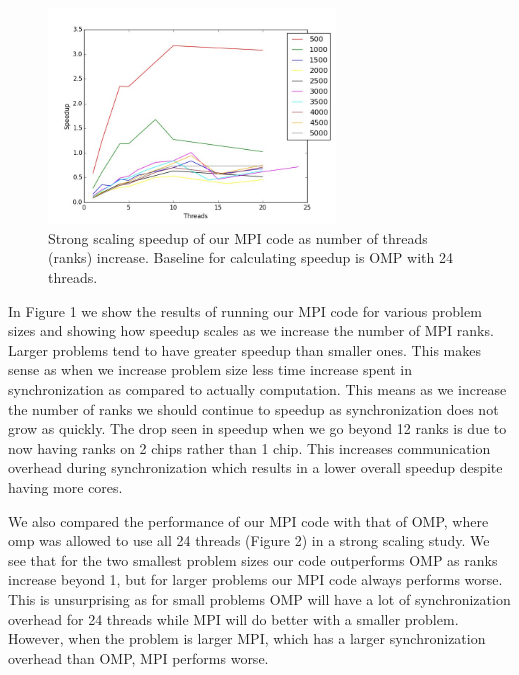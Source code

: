 \begin{figure}[h]
  \centering
  \includegraphics[width=0.68\textwidth] {plots/2}
  \caption{%
    Strong scaling speedup of our MPI code as number of threads (ranks)
    increase. Baseline for calculating speedup is OMP with 24 threads.
  }
  \label{aload1}
\end{figure}

In Figure 1 we show the results of running our MPI code for various problem
sizes and showing how speedup scales as we increase the number of MPI ranks.
Larger problems tend to have greater speedup than smaller ones. This makes
sense as when we increase problem size less time increase spent in
synchronization as compared to actually computation. This means as we increase
the number of ranks we should continue to speedup as synchronization does not
grow as quickly. The drop seen in speedup when we go beyond 12 ranks is due to
now having ranks on 2 chips rather than 1 chip. This increases communication
overhead during synchronization which results in a lower overall speedup
despite having more cores.

We also compared the performance of our MPI code with that of OMP, where omp
was allowed to use all 24 threads (Figure 2) in a strong scaling study. We see
that for the two smallest problem sizes our code outperforms OMP as ranks
increase beyond 1, but for larger problems our MPI code always performs worse.
This is unsurprising as for small problems OMP will have a lot of
synchronization overhead for 24 threads while MPI will do better with a smaller
problem. However, when the problem is larger MPI, which has a larger
synchronization overhead than OMP, MPI performs worse.

